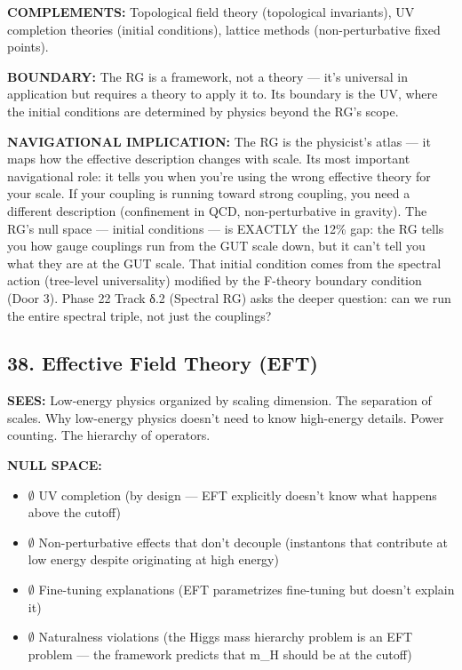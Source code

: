 \textbf{COMPLEMENTS:} Topological field theory (topological invariants), UV completion theories (initial conditions), lattice methods (non-perturbative fixed points).


\textbf{BOUNDARY:} The RG is a framework, not a theory — it's universal in application but requires a theory to apply it to. Its boundary is the UV, where the initial conditions are determined by physics beyond the RG's scope.


\textbf{NAVIGATIONAL IMPLICATION:} The RG is the physicist's atlas — it maps how the effective description changes with scale. Its most important navigational role: it tells you when you're using the wrong effective theory for your scale. If your coupling is running toward strong coupling, you need a different description (confinement in QCD, non-perturbative in gravity). The RG's null space — initial conditions — is EXACTLY the 12\% gap: the RG tells you how gauge couplings run from the GUT scale down, but it can't tell you what they are at the GUT scale. That initial condition comes from the spectral action (tree-level universality) modified by the F-theory boundary condition (Door 3). Phase 22 Track δ.2 (Spectral RG) asks the deeper question: can we run the entire spectral triple, not just the couplings?


\bigskip\noindent\makebox[\textwidth]{\color{rulegray}\rule{5cm}{0.3pt}}\bigskip


\subsection*{38. Effective Field Theory (EFT)}


\textbf{SEES:} Low-energy physics organized by scaling dimension. The separation of scales. Why low-energy physics doesn't need to know high-energy details. Power counting. The hierarchy of operators.


\textbf{NULL SPACE:}

\begin{itemize}[nosep,leftmargin=*]
  \item $\emptyset$ UV completion (by design — EFT explicitly doesn't know what happens above the cutoff)
  \item $\emptyset$ Non-perturbative effects that don't decouple (instantons that contribute at low energy despite originating at high energy)
  \item $\emptyset$ Fine-tuning explanations (EFT parametrizes fine-tuning but doesn't explain it)
  \item $\emptyset$ Naturalness violations (the Higgs mass hierarchy problem is an EFT problem — the framework predicts that m\_H should be at the cutoff)
\end{itemize}



